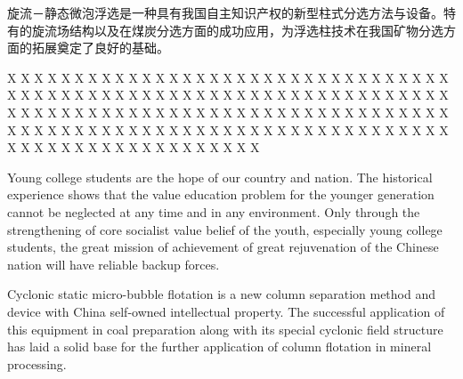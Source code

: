 \begin{cnabstract}
旋流－静态微泡浮选是一种具有我国自主知识产权的新型柱式分选方法与设备。特有的旋流场结构以及在煤炭分选方面的成功应用，为浮选柱技术在我国矿物分选方面的拓展奠定了良好的基础。

X X X X X X X X X X X X X X X X X X X X X X X X X X X X X X X X X X X X X X X X X X X X X X X X X X X X X X X X X X X X X X X X X X X X X X X X X X X X X X X X X X X X X X X X X X X X X X X X X X X X X X X X X X X X X X X X X X X X X X X X X X X X X X X X X X X X X X X X X X X X X X X X X X X X X X X 

\end{cnabstract}


\begin{enabstract}
Young college students are the hope of our country and nation. The historical experience shows that the value education problem for the younger generation cannot be neglected at any time and in any environment. Only through the strengthening of core socialist value belief of the youth, especially young college students, the great mission of achievement of great rejuvenation of the Chinese nation will have reliable backup forces.

Cyclonic static micro-bubble flotation is a new column separation method and device with China self-owned intellectual property.  The successful application of this equipment in coal preparation along with its special cyclonic field structure has laid a solid base for the further application of column flotation in mineral processing.

\end{enabstract}